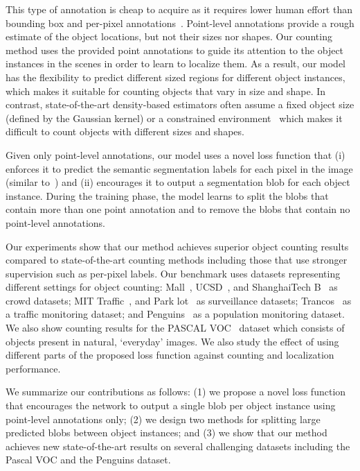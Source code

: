 \documentclass[runningheads]{llncs}
\begin{document}
This type of annotation is cheap to acquire as it requires lower human effort than bounding box and per-pixel annotations~\cite{bearman2016s}. Point-level annotations provide a rough estimate of the object locations, but not their sizes nor shapes. Our counting method uses the provided point annotations to guide its attention to the object instances in the scenes in order to learn to localize them. As a result, our model has the flexibility to predict different sized regions for different object instances, which makes it suitable for counting objects that vary in size and shape. In contrast, state-of-the-art density-based estimators often assume a fixed object size (defined by the Gaussian kernel) or a constrained environment~\cite{TRANCOSdataset_IbPRIA2015} which makes it difficult to count objects with different sizes and shapes.

Given only point-level annotations, our model uses a novel loss function that (i) enforces it to predict the semantic segmentation labels for each pixel in the image (similar to~\cite{bearman2016s}) and (ii) encourages it to output a segmentation blob for each object instance. During the training phase, the model learns to split the blobs that contain more than one point annotation and to remove the blobs that contain no point-level annotations.

Our experiments show that our method achieves superior object counting results compared to state-of-the-art counting methods including those that use stronger supervision such as per-pixel labels. Our benchmark uses datasets representing different settings for object counting: Mall~\cite{chen2012feature}, UCSD~\cite{chan2008privacy}, and ShanghaiTech B~\cite{zhang2016single} as crowd datasets; MIT Traffic~\cite{wang2009unsupervised}, and Park lot~\cite{de2015pklot} as surveillance datasets; Trancos~\cite{TRANCOSdataset_IbPRIA2015} as a traffic monitoring dataset; and Penguins~\cite{arteta2016counting} as a population monitoring dataset. We also show counting results for the PASCAL VOC~\cite{everingham2015pascal} dataset which consists of objects present in natural, `everyday' images. We also study the effect of using different parts of the proposed loss function against counting and localization performance. 

We summarize our contributions as follows: (1) we propose a novel loss function that encourages the network to output a single blob per object instance using point-level annotations only; (2) we design two methods for splitting large predicted blobs between object instances; and (3) we show that our method achieves new state-of-the-art results on several challenging datasets including the Pascal VOC and the Penguins dataset. 
\end{document}
